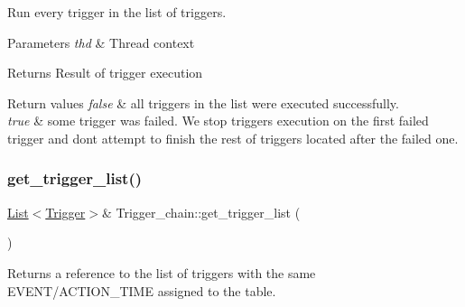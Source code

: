 Run every trigger in the list of triggers.


\begin{DoxyParams}{Parameters}
{\em thd} & Thread context \\
\hline
\end{DoxyParams}
\begin{DoxyReturn}{Returns}
Result of trigger execution 
\end{DoxyReturn}

\begin{DoxyRetVals}{Return values}
{\em false} & all triggers in the list were executed successfully. \\
\hline
{\em true} & some trigger was failed. We stop triggers execution on the first failed trigger and don\textquotesingle{}t attempt to finish the rest of triggers located after the failed one. \\
\hline
\end{DoxyRetVals}
\mbox{\label{classTrigger__chain_a742711c61ef94fb62f01ddb3d9a59678}} 
\subsubsection{\texorpdfstring{get\+\_\+trigger\+\_\+list()}{get\_trigger\_list()}}
{\footnotesize\ttfamily \mbox{\hyperlink{classList}{List}}$<$\mbox{\hyperlink{classTrigger}{Trigger}}$>$\& Trigger\+\_\+chain\+::get\+\_\+trigger\+\_\+list (\begin{DoxyParamCaption}{ }\end{DoxyParamCaption})\hspace{0.3cm}{\ttfamily [inline]}}

\begin{DoxyReturn}{Returns}
a reference to the list of triggers with the same E\+V\+E\+N\+T/\+A\+C\+T\+I\+O\+N\+\_\+\+T\+I\+ME assigned to the table. 
\end{DoxyReturn}
\mbox{\label{classTrigger__chain_a3164d154777f1449b64f0460030163f8}} 
